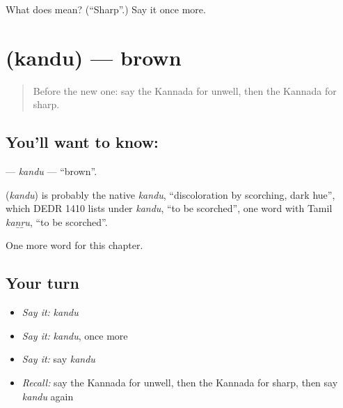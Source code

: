 \begin{tcolorbox}[breakable,colback=teal!4,colframe=teal!35!black,title={Before you move on}]
What does  mean? (\textquotedblleft{}Sharp\textquotedblright{}.) Say it once more.
\end{tcolorbox}
\section[\texorpdfstring{\kn{ಕಂದು} (kandu)}{ಕಂದು (kandu)}]{ (kandu) — brown}

\label{lesson:KA-C254-kandu}



\begin{quote}
Before the new one: say the Kannada for unwell, then the Kannada for sharp.
\end{quote}

\subsection*{You'll want to know: }
\textbf{} — \emph{kandu} — \textquotedblleft{}brown\textquotedblright{}.

\begin{cousinweb}
\textbf{} (\emph{kandu}) is probably the native \emph{kandu}, \textquotedblleft{}discoloration by scorching, dark hue\textquotedblright{}, which DEDR 1410 lists under \emph{kandu}, \textquotedblleft{}to be scorched\textquotedblright{}, one word with Tamil \emph{kaṉṟu}, \textquotedblleft{}to be scorched\textquotedblright{}.
\end{cousinweb}

\begin{grammarlens}[title={What you've built}]
One more word for this chapter.
\end{grammarlens}

\subsection*{Your turn}
\begin{itemize}
\raggedright
  \item \emph{Say it:} \emph{kandu}
  \item \emph{Say it:} \emph{kandu}, once more
  \item \emph{Say it:} say \emph{kandu}
  \item \emph{Recall:} say the Kannada for unwell, then the Kannada for sharp, then say \emph{kandu} again
\end{itemize}

